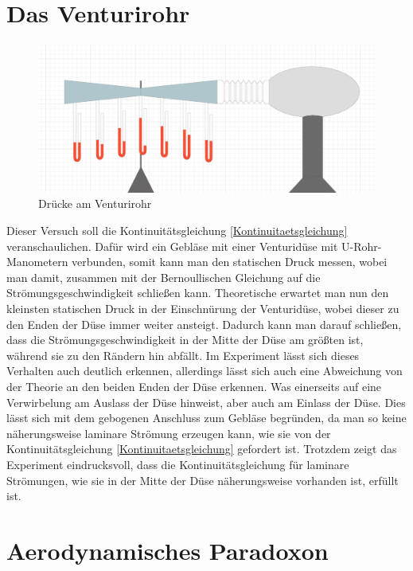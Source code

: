 \section{Das Venturirohr}

\begin{figure}[h!]
    \centering
    \includegraphics[scale=0.5]{./Aeromechanik/Protokoll/fig/Venturi_Rohr.png}
    \caption{Drücke am Venturirohr}
    \label{fig:Venturi}
\end{figure}

Dieser Versuch soll die Kontinuitätsgleichung \ref{Kontinuitaetsgleichung} veranschaulichen. Dafür wird ein Gebläse mit einer Venturidüse mit U-Rohr-Manometern verbunden, somit kann man den statischen Druck messen, wobei man damit, zusammen mit der Bernoullischen Gleichung auf die Strömungsgeschwindigkeit schließen kann. Theoretische erwartet man nun den kleinsten statischen Druck in der Einschnürung der Venturidüse, wobei dieser zu den Enden der Düse immer weiter ansteigt. Dadurch kann man darauf schließen, dass die Strömungsgeschwindigkeit in der Mitte der Düse am größten ist, während sie zu den Rändern hin abfällt. Im Experiment lässt sich dieses Verhalten auch deutlich erkennen, allerdings lässt sich auch eine Abweichung von der Theorie an den beiden Enden der Düse erkennen. Was einerseits auf eine Verwirbelung am Auslass der Düse hinweist, aber auch am Einlass der Düse. Dies lässt sich mit dem gebogenen Anschluss zum Gebläse begründen, da man so keine näherungsweise laminare Strömung erzeugen kann, wie sie von der Kontinuitätsgleichung \ref{Kontinuitaetsgleichung} gefordert ist. Trotzdem zeigt das Experiment eindrucksvoll, dass die Kontinuitätsgleichung für laminare Strömungen, wie sie in der Mitte der Düse näherungsweise vorhanden ist, erfüllt ist.

\section{Aerodynamisches Paradoxon}

